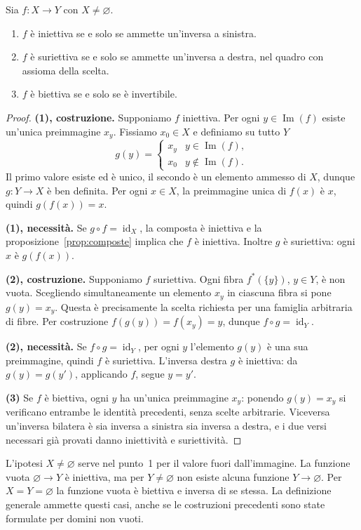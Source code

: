 \begin{teorema}\label{teo:inverse}
Sia $f:X\to Y$ con $X\ne\varnothing$.
\begin{enumerate}[label=\arabic*.]
\item $f$ è iniettiva se e solo se ammette un'inversa a sinistra.
\item $f$ è suriettiva se e solo se ammette un'inversa a destra, nel quadro con assioma della scelta.
\item $f$ è biettiva se e solo se è invertibile.
\end{enumerate}
\end{teorema}
\begin{proof}
\textbf{(1), costruzione.} Supponiamo $f$ iniettiva. Per ogni $y\in\operatorname{Im}(f)$ esiste un'unica preimmagine $x_y$. Fissiamo $x_0\in X$ e definiamo su tutto $Y$
\[
g(y)=\begin{cases}x_y&y\in\operatorname{Im}(f),\\x_0&y\notin\operatorname{Im}(f).\end{cases}
\]
Il primo valore esiste ed è unico, il secondo è un elemento ammesso di $X$, dunque $g:Y\to X$ è ben definita. Per ogni $x\in X$, la preimmagine unica di $f(x)$ è $x$, quindi $g(f(x))=x$.

\textbf{(1), necessità.} Se $g\circ f=\operatorname{id}_X$, la composta è iniettiva e la proposizione~\ref{prop:composte} implica che $f$ è iniettiva. Inoltre $g$ è suriettiva: ogni $x$ è $g(f(x))$.

\textbf{(2), costruzione.} Supponiamo $f$ suriettiva. Ogni fibra $f^*(\{y\})$, $y\in Y$, è non vuota. Scegliendo simultaneamente un elemento $x_y$ in ciascuna fibra si pone $g(y)=x_y$. Questa è precisamente la scelta richiesta per una famiglia arbitraria di fibre. Per costruzione $f(g(y))=f(x_y)=y$, dunque $f\circ g=\operatorname{id}_Y$.

\textbf{(2), necessità.} Se $f\circ g=\operatorname{id}_Y$, per ogni $y$ l'elemento $g(y)$ è una sua preimmagine, quindi $f$ è suriettiva. L'inversa destra $g$ è iniettiva: da $g(y)=g(y')$, applicando $f$, segue $y=y'$.

\textbf{(3)} Se $f$ è biettiva, ogni $y$ ha un'unica preimmagine $x_y$: ponendo $g(y)=x_y$ si verificano entrambe le identità precedenti, senza scelte arbitrarie. Viceversa un'inversa bilatera è sia inversa a sinistra sia inversa a destra, e i due versi necessari già provati danno iniettività e suriettività.
\end{proof}

\begin{osservazione}
L'ipotesi $X\ne\varnothing$ serve nel punto~1 per il valore fuori dall'immagine. La funzione vuota $\varnothing\to Y$ è iniettiva, ma per $Y\ne\varnothing$ non esiste alcuna funzione $Y\to\varnothing$. Per $X=Y=\varnothing$ la funzione vuota è biettiva e inversa di se stessa. La definizione generale ammette questi casi, anche se le costruzioni precedenti sono state formulate per domini non vuoti.
\end{osservazione}

